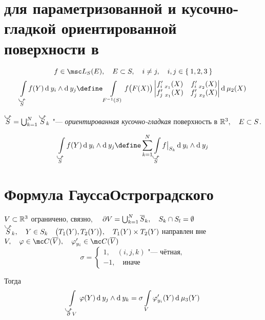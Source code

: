 \section{ для параметризованной и кусочно-гладкой ориентированной поверхности в }

\begin{definition}
	$$ f \in \msc L_S(E), \quad E \sub S, \quad i \ne j, \quad i, j \in \set{1, 2, 3} $$
	$$ \int\limits_{\curvedir S} f(Y) \di y_i \wedge \di y_j \define \int\limits_{F^{-1}(S)} f \bigl(F(X) \bigr)
	\begin{vmatrix}
		f_{i~x_1}'(X) & f_{i~x_2}'(X) \\
		f_{j~x_1}'(X) & f_{j~x_2}'(X)
	\end{vmatrix} \di \mu_2(X) $$
\end{definition}

\begin{definition}
	$ \curvedir S = \bigcup_{k = 1}^N \curvedir S_k $ "--- \emph{ориентированная кусочно-гладкая} поверхность в $ \mathbb{R}^3, \quad E \subset S $.
	
	$$ \int\limits_{\curvedir S} f(Y) \di y_i \wedge \di y_j \define \sum_{k = 1}^N \int\limits_{\curvedir S} f\big|_{S_k}\di y_i \wedge \di y_j $$
\end{definition}

\section{Формула ГауссаОстроградского}

\begin{theorem}
	$ V \subset \mathbb{R}^3 $ ограничено, связно, $ \quad \partial V = \bigcup_{k = 1}^N \overline S_k, \quad S_k \cap S_l = \emptyset $ \\
	$ \curvedir S_k, \quad Y \in S_k \quad \bigl( T_1(Y), T_2(Y) \bigr), \quad T_1(Y) \times T_2(Y) $ направлен вне $ V, \quad \phi \in \mc C(\ol V), \quad \phi_{y_i}' \in \mc C(\ol V) $
	$$ \sigma =
	\begin{cases}
		1, \quad (i, j, k) \text{ "--- чётная}, \\
		-1, \quad \text{иначе}
	\end{cases} $$

	Тогда
	$$ \int\limits_{\curvedir \partial V} \phi(Y) \di y_j \wedge \di y_k = \sigma \int\limits_V \phi_{y_i}'(Y) \di \mu_3(Y) $$
\end{theorem}

